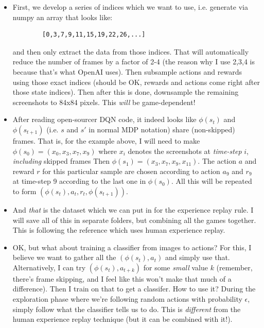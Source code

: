 \documentclass[letterpaper, 10pt, conference]{ieeeconf}
\begin{document}
\begin{itemize}
        \item First, we develop a series of indices which we want to use, i.e.
        generate via numpy an array that looks like:
        \begin{verbatim}
        [0,3,7,9,11,15,19,22,26,...]
        \end{verbatim}
        and then only extract the data from those indices. That will
        automatically reduce the number of frames by a factor of 2-4 (the reason
        why I use 2,3,4 is because that's what OpenAI uses). Then subsample
        actions and rewards using those exact indices (should be OK, rewards and
        actions come right after those state indices). Then after this is done,
        downsample the remaining screenshots to 84x84 pixels. This \emph{will}
        be game-dependent!

        \item After reading open-sourcer DQN code, it indeed looks like
        $\phi(s_t)$ and $\phi(s_{t+1})$ (i.e. $s$ and $s'$ in normal MDP
        notation) share (non-skipped) frames. That is, for the example above, I
        will need to make $\phi(s_0) = (x_0,x_3,x_7,x_9)$ where $x_i$ denotes
        the screenshots at \emph{time-step} $i$, \emph{including} skipped frames
        Then $\phi(s_1) = (x_3,x_7,x_9,x_{11})$. The action $a$ and reward $r$
        for this particular sample are chosen according to action $a_9$ and
        $r_9$ at time-step 9 according to the last one in $\phi(s_0)$. All this
        will be repeated to form $(\phi(s_t),a_t,r_t,\phi(s_{t+1}))$.

        \item And \emph{that} is the dataset which we can put in for the
        experience replay rule. I will save all of this in separate folders, but
        combining all the games together. This is following the reference which
        uses human experience replay.

        \item OK, but what about training a classifier from images to actions?
        For this, I believe we want to gather all the $(\phi(s_t),a_t)$ and
        simply use that. Alternatively, I can try $(\phi(s_t),a_{t+k})$ for some
        \emph{small} value $k$ (remember, there's frame skipping, and I feel
        like this won't make that much of a difference). Then I train on that to
        get a classifer. How to use it? During the exploration phase where we're
        following random actions with probability $\epsilon$, simply follow what
        the classifier tells us to do. This is \emph{different} from the human
        experience replay technique (but it can be combined with it!).
\end{itemize}
\end{document}
